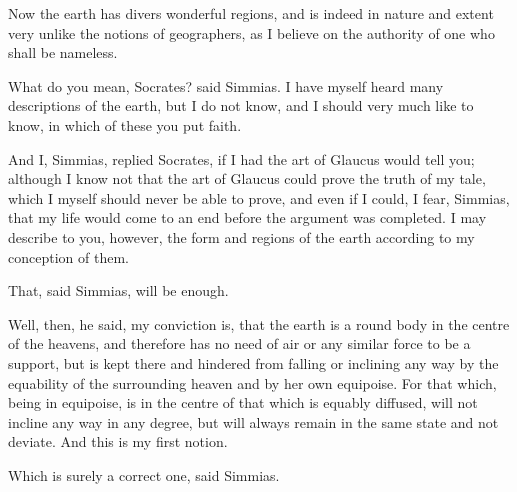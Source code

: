 Now the earth has divers wonderful regions, and is indeed in nature and
extent very unlike the notions of geographers, as I believe on the
authority of one who shall be nameless.

What do you mean, Socrates? said Simmias. I have myself heard many
descriptions of the earth, but I do not know, and I should very much like
to know, in which of these you put faith.

And I, Simmias, replied Socrates, if I had the art of Glaucus would tell
you; although I know not that the art of Glaucus could prove the truth of
my tale, which I myself should never be able to prove, and even if I
could, I fear, Simmias, that my life would come to an end before the
argument was completed. I may describe to you, however, the form and
regions of the earth according to my conception of them.

That, said Simmias, will be enough.

Well, then, he said, my conviction is, that the earth is a round body in
the centre of the heavens, and therefore has no need of air or any similar
force to be a support, but is kept there and hindered from falling or
inclining any way by the equability of the surrounding heaven and by her
own equipoise. For that which, being in equipoise, is in the centre of
that which is equably diffused, will not incline any way in any degree,
but will always remain in the same state and not deviate. And this is my
first notion.

Which is surely a correct one, said Simmias.

